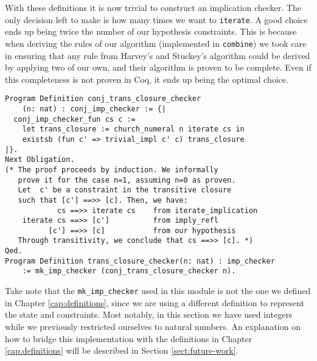 With these definitions it is now trivial to construct an implication checker. The only decision
left to make is how many times we want to \texttt{iterate}. A good choice ends up
being twice the number of our hypothesis constraints. This is because when deriving the rules of
our algorithm (implemented in \texttt{combine}) we took care in ensuring that any rule
from Harvey's and Stuckey's algorithm\cite{HarveyStuckey} could be derived by applying two of 
our own, and their algorithm is proven to be complete. Even if this completeness is not proven
in Coq, it ends up being the optimal choice.

\begin{verbatim}
Program Definition conj_trans_closure_checker
    (n: nat) : conj_imp_checker := {|
  conj_imp_checker_fun cs c := 
    let trans_closure := church_numeral n iterate cs in 
    existsb (fun c' => trivial_impl c' c) trans_closure
|}.
Next Obligation. 
(* The proof proceeds by induction. We informally
   prove it for the case n=1, assuming n=0 as proven.
   Let  c' be a constraint in the transitive closure
   such that [c'] ==>> [c]. Then, we have:
            cs ==>> iterate cs    from iterate_implication
    iterate cs ==>> [c']          from imply_refl
          [c'] ==>> [c]           from our hypothesis
   Through transitivity, we conclude that cs ==>> [c]. *)
Qed. 
Program Definition trans_closure_checker(n: nat) : imp_checker 
    := mk_imp_checker (conj_trans_closure_checker n).
\end{verbatim}

Take note that the \texttt{mk_imp_checker} used in this module is not
the one we defined in Chapter \ref{cap:definitions}, since we are using a different definition
to represent the state and constraints. Most notably, in this section we have used
integers while we previously restricted ourselves to natural numbers. An explanation
on how to bridge this implementation with the definitions in Chapter \ref{cap:definitions}
will be described in Section \ref{sect:future-work}.